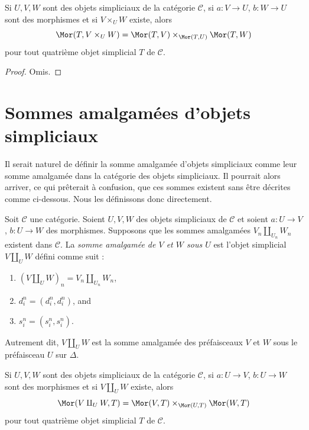 \begin{lemma}
\label{lemma-fibre-product}
Si $U, V, W$ sont des objets simpliciaux de la catégorie $\mathcal{C}$,
si $a : V \to U$, $b : W \to U$ sont des morphismes et si
$V \times_U W$ existe, alors
$$
\Mor(T, V \times_U W) =
\Mor(T, V) \times_{\Mor(T, U)}
\Mor(T, W)
$$
pour tout quatrième objet simplicial $T$ de $\mathcal{C}$.
\end{lemma}

\begin{proof}
Omis.
\end{proof}

\section{Sommes amalgamées d'objets simpliciaux}
\label{section-push-outs}

\noindent
Il serait naturel de définir la somme amalgamée d'objets simpliciaux comme
leur somme amalgamée dans la catégorie des objets simpliciaux. Il pourrait
alors arriver, ce qui prêterait à confusion, que ces sommes existent sans
être décrites comme ci-dessous. Nous les définissons donc directement.

\begin{definition}
\label{definition-push-out}
Soit $\mathcal{C}$ une catégorie. Soient $U, V, W$ des objets simpliciaux
de $\mathcal{C}$ et soient $a : U \to V$, $b : U \to W$ des morphismes.
Supposons que les sommes amalgamées $V_n \amalg_{U_n} W_n$ existent dans
$\mathcal{C}$. La {\it somme amalgamée de $V$ et $W$ sous $U$} est
l'objet simplicial $V\amalg_U W$ défini comme suit :
\begin{enumerate}
\item $(V \amalg_U W)_n = V_n \amalg_{U_n} W_n$,
\item $d^n_i = (d^n_i, d^n_i)$, and
\item $s^n_i = (s^n_i, s^n_i)$.
\end{enumerate}
Autrement dit, $V\amalg_U W$ est la somme amalgamée des préfaisceaux
$V$ et $W$ sous le préfaisceau $U$ sur $\Delta$.
\end{definition}

\begin{lemma}
\label{lemma-push-out}
Si $U, V, W$ sont des objets simpliciaux de la catégorie $\mathcal{C}$,
si $a : U \to V$, $b : U \to W$ sont des morphismes et si
$V\amalg_U W$ existe, alors
$$
\Mor(V\amalg_U W, T) =
\Mor(V, T) \times_{\Mor(U, T)}
\Mor(W, T)
$$
pour tout quatrième objet simplicial $T$ de $\mathcal{C}$.
\end{lemma}

